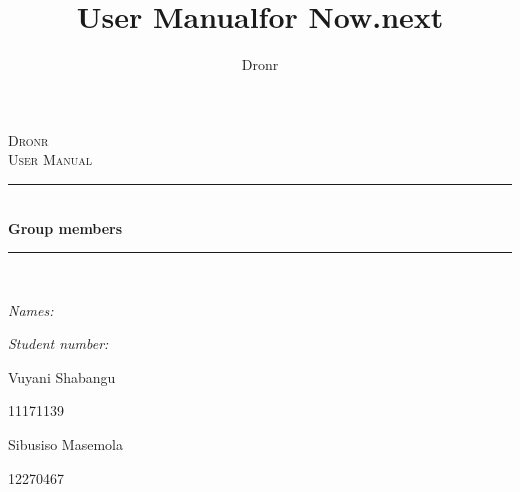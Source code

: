 \documentclass{article}
\author{Dronr}
\title{ User Manual}
\title{for Now.next}
\newcommand{\HRule}{\rule{\linewidth}{0.5mm}}
\begin{document}
	\setlength{\parskip}{6pt}
	
	\begin{titlepage}
		
		\begin{center}
		
			\textsc{\LARGE Dronr}\\[1.5cm]
			\textsc{\Large User Manual}\\[0.5cm]
			\HRule \\[0.4cm]
			{ \huge \bfseries Group members}\\[0.3cm]
			\HRule \\[0.3cm]
			\begin{minipage}{0.4\textwidth}
				\begin{flushleft} \large
					\emph{Names:}
				\end{flushleft}
			\end{minipage}
			\begin{minipage}{0.4\textwidth}
				\begin{flushright} \large
					\emph{Student number:}
				\end{flushright}
			\end{minipage}
			
			\begin{minipage}{0.4\textwidth}
				\begin{flushleft} \large
					Vuyani {Shabangu}
				\end{flushleft}
			\end{minipage}
			\begin{minipage}{0.4\textwidth}
				\begin{flushright} \large
					\emph{}
					11171139
				\end{flushright}
			\end{minipage}
			
			\begin{minipage}{0.4\textwidth}
				\begin{flushleft} \large
					Sibusiso {Masemola}
				\end{flushleft}
			\end{minipage}
			\begin{minipage}{0.4\textwidth}
				\begin{flushright} \large
					\emph{}
					12270467
				\end{flushright}
			\end{minipage}
			

\end{center}
\end{titlepage}
\end{document}
